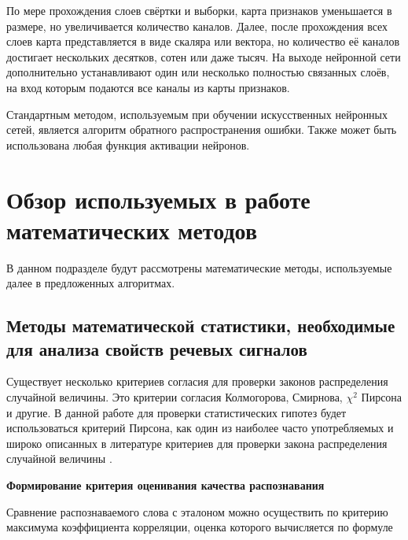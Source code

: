 По мере прохождения слоев свёртки и выборки, карта признаков уменьшается в размере, но увеличивается количество каналов.
Далее, после прохождения всех слоев карта представляется в виде скаляра или вектора, но количество её каналов достигает нескольких десятков, сотен или даже тысяч.
На выходе нейронной сети дополнительно устанавливают один или несколько полностью связанных слоёв, на вход которым подаются все каналы из карты признаков.

Стандартным методом, используемым при обучении искусственных нейронных сетей, является алгоритм обратного распространения ошибки.
Также может быть использована любая функция активации нейронов.


\section{Обзор используемых в работе математических методов} \label{sect1_4}

В данном подразделе будут рассмотрены математические методы, используемые далее в предложенных алгоритмах.


\subsection{Методы математической статистики, необходимые для анализа свойств речевых сигналов} \label{sect1_4_1}

Существует несколько критериев согласия для проверки законов распределения случайной величины.
Это критерии согласия Колмогорова, Смирнова, $\chi^2$ Пирсона и другие.
В данной работе для проверки статистических гипотез будет использоваться критерий Пирсона, как один из наиболее часто употребляемых и широко описанных в литературе критериев для проверки закона распределения случайной величины \cite{panteleev2001}.

\textbf{Формирование критерия оценивания качества распознавания}

Сравнение распознаваемого слова с эталоном можно осуществить по критерию максимума коэффициента корреляции, оценка которого вычисляется по формуле 

